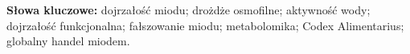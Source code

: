\documentclass[12pt,a4paper]{article}
\begin{document}
\noindent\textbf{Słowa kluczowe:} dojrzałość miodu; drożdże osmofilne;
aktywność wody; dojrzałość funkcjonalna; fałszowanie miodu;
metabolomika; Codex Alimentarius; globalny handel miodem.



























\end{document}

